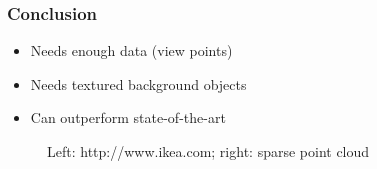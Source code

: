 \documentclass{beamer}
\begin{document}
\begin{frame}
  \frametitle{Conclusion}
  \begin{itemize}
    \item Needs enough data (view points)
    \item Needs textured background objects
    \item Can outperform state-of-the-art
  \end{itemize}
  \pause
  \begin{figure}[htb!]
   \centering
   \caption*{\tiny Left: http://www.ikea.com; right: sparse point cloud}
   \label{fig:bjorn}
  \end{figure}
\end{frame}
\end{document}
